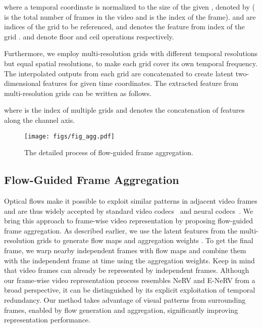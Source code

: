 \documentclass[sigconf]{acmart}
\begin{document}
where a temporal coordinate  is normalized to the size of the given , denoted by  ( is the total number of frames in the video and  is the index of the frame).
 and  are indices of the grid  to be referenced, and  denotes the feature from index  of the grid .
 and  denote floor and ceil operations respectively.

Furthermore, we employ multi-resolution grids with different temporal resolutions but equal spatial resolutions, to make each grid cover its own temporal frequency.
The interpolated outputs from each grid are concatenated to create latent two-dimensional features for given time coordinates.
The extracted feature from multi-resolution grids  can be written as follows.

where  is the index of multiple grids and  denotes the concatenation of  features along the channel axis.


\begin{figure}[t]
\begin{center}
\texttt{[image: figs/fig\_agg.pdf]}
\end{center}
   \caption{The detailed process of flow-guided frame aggregation.}
\label{fig_agg}
\end{figure}


\subsection{Flow-Guided Frame Aggregation}
\label{ssec:flow_guided_agg}
Optical flows make it possible to exploit similar patterns in adjacent video frames and are thus widely accepted by standard video codecs~\cite{h264,hevc} and neural codecs~\cite{dvc,fvc,hybridcomp}.
We bring this approach to frame-wise video representation by proposing flow-guided frame aggregation.
As described earlier, we use the latent features  from the multi-resolution grids to generate flow maps  and aggregation weights .
To get the final frame, we warp nearby independent frames with flow maps and combine them with the independent frame at time  using the aggregation weights.
Keep in mind that video frames can already be represented by independent frames.
Although our frame-wise video representation process resembles NeRV and E-NeRV from a broad perspective, it can be distinguished by its explicit exploitation of temporal redundancy. 
Our method takes advantage of visual patterns from surrounding frames, enabled by flow generation and aggregation, significantly improving representation performance.
\end{document}
